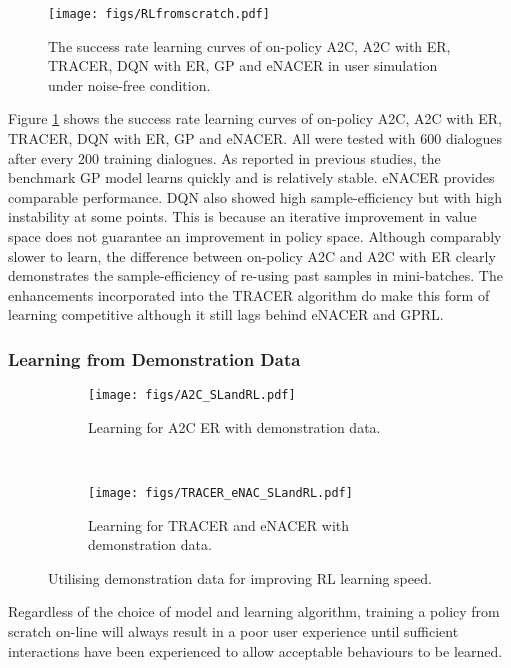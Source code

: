 \documentclass[11pt,a4paper]{article}
\begin{document}
\label{sec:simulate}
\begin{figure}[t]
\centerline{\texttt{[image: figs/RLfromscratch.pdf]}}
\caption{The success rate learning curves of on-policy A2C, A2C with ER, TRACER, DQN with ER, GP and eNACER in user simulation under noise-free condition.} 
\label{fig:DRL_curve}
\vspace{-2mm}
\end{figure}

Figure \ref{fig:DRL_curve} shows the success rate learning curves of on-policy A2C, A2C with ER, TRACER, DQN with ER, GP and eNACER. All were tested with 600 dialogues after every 200 training dialogues. 
As reported in previous studies, the benchmark GP model learns quickly and is relatively stable. eNACER provides comparable performance.  
DQN also showed high sample-efficiency but with high instability at some points. This
is because an iterative improvement in value space does not guarantee an improvement in policy space.
Although comparably slower to learn, the difference between on-policy A2C and A2C with ER clearly demonstrates the sample-efficiency of re-using past samples in mini-batches.
The enhancements incorporated into the TRACER algorithm do make this form of learning competitive although it still lags behind eNACER and GPRL.

\subsubsection{Learning from Demonstration Data} \label{sec:supervised}

\begin{figure*}[t!]
    \centering
    \begin{subfigure}[t]{0.5\textwidth}
        \centering
        \texttt{[image: figs/A2C\_SLandRL.pdf]}
        \caption{Learning for A2C ER with demonstration data.}
        \label{fig:a2c_slrl}
    \end{subfigure}%
    ~ 
    \begin{subfigure}[t]{0.5\textwidth}
        \centering
        \texttt{[image: figs/TRACER\_eNAC\_SLandRL.pdf]}
        \caption{Learning for TRACER and eNACER with demonstration data.}
        \label{fig:a2c_tracer_slrl}
    \end{subfigure}
    \caption{Utilising demonstration data for improving RL learning speed.}
\end{figure*}


Regardless of the choice of  model and learning algorithm, training a policy from scratch on-line will always result in a poor user experience until sufficient interactions have been experienced to allow acceptable behaviours to be learned.
\end{document}
